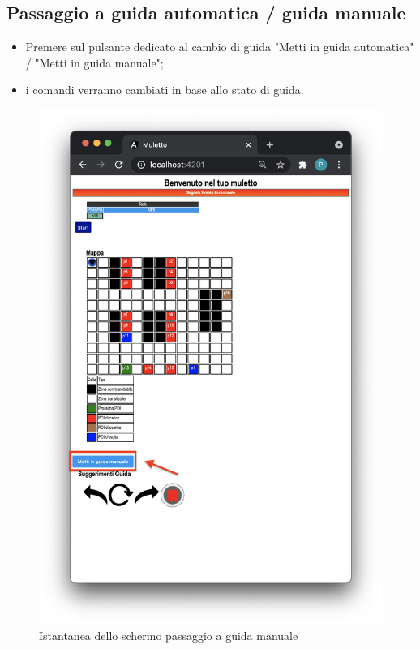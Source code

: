 \subsection{Passaggio a guida automatica / guida manuale}
\begin{itemize}
    \item Premere sul pulsante dedicato al cambio di guida "Metti in guida automatica" / "Metti in guida manuale";
    \item i comandi verranno cambiati in base allo stato di guida.
\end{itemize}
\begin{figure}[H]
\centering
\includegraphics[scale=0.45]{res/images/forklift_guidamanuale.png}
\caption{Istantanea dello schermo passaggio a guida manuale}
\end{figure}


